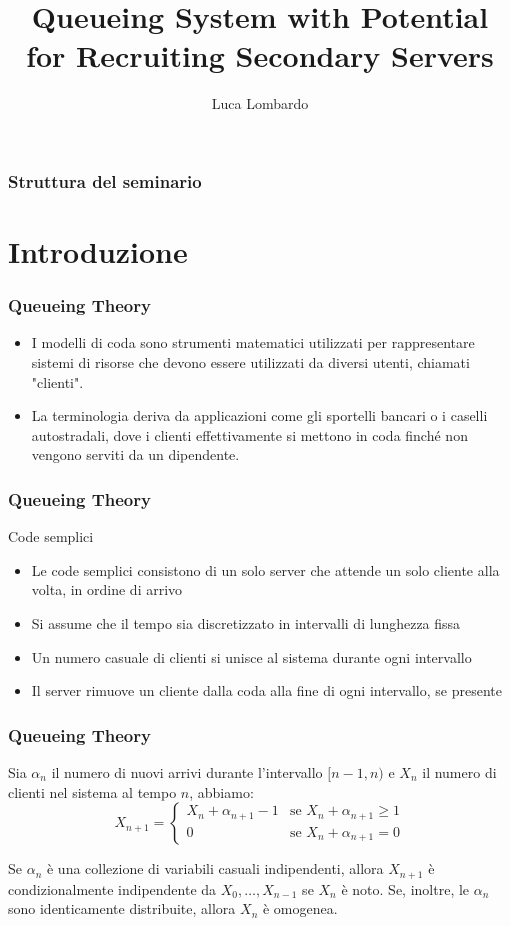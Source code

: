 \documentclass{beamer}
\title{Queueing System with Potential for Recruiting Secondary Servers}
\author{Luca Lombardo}
\institute{Seminario per Metodi Numerici per Catene di Markov}
\date{}
\begin{document}
\frame{\titlepage}


\begin{frame}
    \frametitle{Struttura del seminario}
    \tableofcontents
\end{frame}

\section{Introduzione}
\begin{frame}
    \frametitle{Queueing Theory}
    \begin{itemize}
        \item I modelli di coda sono strumenti matematici utilizzati per rappresentare sistemi di risorse che devono essere utilizzati da diversi utenti, chiamati "clienti".
        \item La terminologia deriva da applicazioni come gli sportelli bancari o i caselli autostradali, dove i clienti effettivamente si mettono in coda finché non vengono serviti da un dipendente.
    \end{itemize}
\end{frame}


\begin{frame}
    \frametitle{Queueing Theory}
    \begin{block}{Code semplici}
        \begin{itemize}
            \item Le code semplici consistono di un solo server che attende un solo cliente alla volta, in ordine di arrivo
            \item Si assume che il tempo sia discretizzato in intervalli di lunghezza fissa
            \item Un numero casuale di clienti si unisce al sistema durante ogni intervallo
            \item Il server rimuove un cliente dalla coda alla fine di ogni intervallo, se presente
        \end{itemize}
    \end{block}
\end{frame}


\begin{frame}
\frametitle{Queueing Theory}
Sia $\alpha_n$ il numero di nuovi arrivi durante l'intervallo $[n - 1, n)$ e $X_n$ il numero di clienti nel sistema al tempo $n$, abbiamo:
\begin{equation*}
    X_{n+1} =
    \begin{cases}
        X_n + \alpha_{n+1} - 1 & \text{se } X_n + \alpha_{n+1} \geq 1 \\
        0 & \text{se } X_n + \alpha_{n+1} = 0
    \end{cases}
\end{equation*}
\begin{block}{}
    Se ${\alpha_n}$ è una collezione di variabili casuali indipendenti, allora $X_{n+1}$ è condizionalmente indipendente da $X_0, \ldots, X_{n-1}$ se $X_n$ è noto. Se, inoltre, le $\alpha_n$ sono identicamente distribuite, allora ${X_n}$ è omogenea.
\end{block}
\end{frame}
\end{document}

